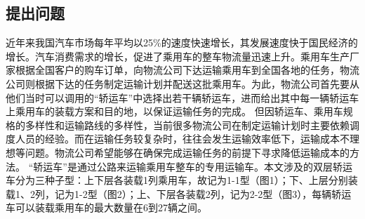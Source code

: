 \documentclass[UTF8，12pt]{ctexart}
\begin{document}
\subsection{提出问题}
	近年来我国汽车市场每年平均以25\%的速度快速增长，其发展速度快于国民经济的增长。汽车消费需求的增长，促进了乘用车的整车物流量迅速上升。乘用车生产厂家根据全国客户的购车订单，向物流公司下达运输乘用车到全国各地的任务，物流公司则根据下达的任务制定运输计划并配送这批乘用车。为此，物流公司首先要从他们当时可以调用的“轿运车”中选择出若干辆轿运车，进而给出其中每一辆轿运车上乘用车的装载方案和目的地，以保证运输任务的完成。
但因轿运车、乘用车规格的多样性和运输路线的多样性，当前很多物流公司在制定运输计划时主要依赖调度人员的经验。而在运输任务较复杂时，往往会发生运输效率低下，运输成本不理想等问题。物流公司希望能够在确保完成运输任务的前提下寻求降低运输成本的方法。
“轿运车”是通过公路来运输乘用车整车的专用运输车。本文涉及的双层轿运车分为三种子型：上下层各装载1列乘用车，故记为1-1型（图1）；下、上层分别装载1、2列，记为1-2型（图2）；上、下层各装载2列，记为2-2型（图3），每辆轿运车可以装载乘用车的最大数量在6到27辆之间。
\end{document}
